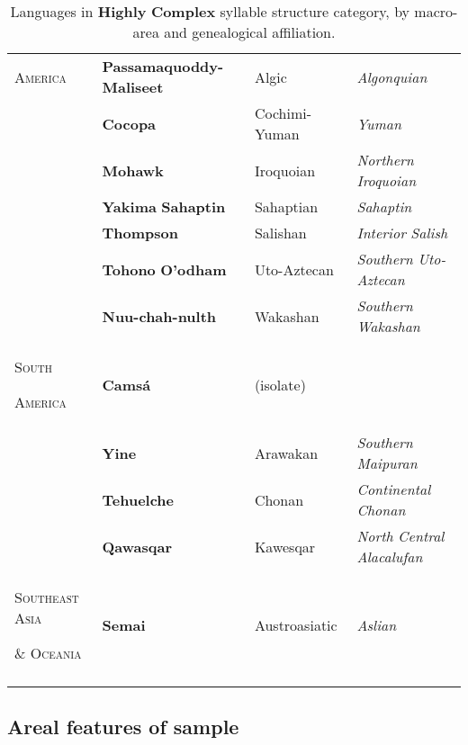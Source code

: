 \begin{table}
\begin{tabularx}{\textwidth}{XXXX}
\textsc{America} & \textbf{Passamaquoddy-Maliseet} & Algic & \textit{Algonquian}\\
\hhline{-~~~} & \textbf{Cocopa} & Cochimi-Yuman & \textit{Yuman}\\
& \textbf{Mohawk} & Iroquoian & \textit{Northern} \textit{Iroquoian}\\
& \textbf{Yakima} \textbf{Sahaptin} & Sahaptian & \textit{Sahaptin}\\
& \textbf{Thompson} & Salishan & \textit{Interior} \textit{Salish}\\
& \textbf{Tohono} \textbf{O’odham} & Uto-Aztecan & \textit{Southern} \textit{Uto-Aztecan}\\
& \textbf{Nuu-chah-nulth} & Wakashan & \textit{Southern} \textit{Wakashan}\\
\textsc{South} 

\textsc{America} & \textbf{Camsá} & (isolate) & \\
\hhline{-~~~} & \textbf{Yine} & Arawakan & \textit{Southern} \textit{Maipuran}\\
& \textbf{Tehuelche} & Chonan & \textit{Continental} \textit{Chonan}\\
& \textbf{Qawasqar} & Kawesqar & \textit{North} \textit{Central} \textit{Alacalufan}\\
\textsc{Southeast} \textsc{Asia} 

\textsc{\&} \textsc{Oceania} & \textbf{Semai} & Austroasiatic & \textit{Aslian}\\
\lspbottomrule
\end{tabularx}
\caption{\label{2.7}Languages in \textbf{Highly} \textbf{Complex} syllable structure category, by macro-area and genealogical affiliation.}
\end{table}

\subsection{Areal features of sample}\label{sec:2.4.1}

